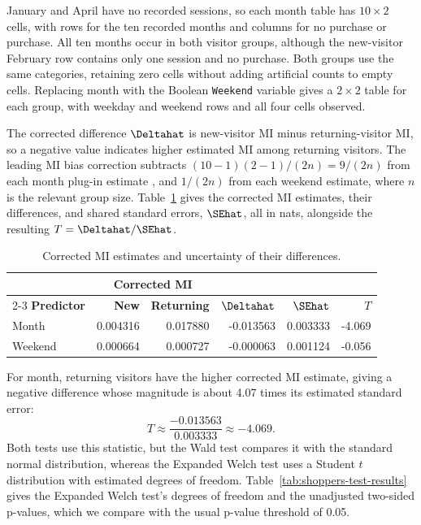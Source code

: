 \begingroup
\setlength{\intextsep}{4pt}
\setlength{\abovecaptionskip}{4pt}
January and April have no recorded sessions, so each month table has
\(10\times2\) cells, with rows for the ten recorded months and columns
for no purchase or purchase. All ten months occur in both visitor groups,
although the new-visitor February row contains only one session and no
purchase. Both groups use the same categories, retaining zero cells
without adding artificial counts to empty cells. Replacing month with the
Boolean \texttt{Weekend}
variable gives a \(2\times2\) table for each group, with weekday and
weekend rows and all four cells observed.

The corrected difference \(\Deltahat\) is new-visitor MI minus
returning-visitor MI, so a negative value indicates higher estimated MI
among returning visitors. The leading MI bias correction subtracts
\((10-1)(2-1)/(2n)=9/(2n)\) from each month plug-in estimate
\citep{miller1955,moddemeijer1989}, and \(1/(2n)\) from each weekend
estimate, where \(n\) is the relevant group size.
Table~\ref{tab:shoppers-application} gives the corrected MI estimates,
their differences, and shared standard errors, \(\SEhat\), all in nats,
alongside the resulting \(T=\Deltahat/\SEhat\).

\begin{table}[H]
\centering
\caption{Corrected MI estimates and uncertainty of their differences.}
\label{tab:shoppers-application}
\thesistableformat
\begin{tabular*}{\textwidth}{@{\extracolsep{\fill}}lrrrrr@{}}
\toprule
 & \multicolumn{2}{c}{\textbf{Corrected MI}} & & & \\
\cmidrule(lr){2-3}
\textbf{Predictor} & \textbf{New} & \textbf{Returning} & \(\Deltahat\) & \(\SEhat\) & \(T\)\\
\midrule
Month & 0.004316 & 0.017880 & -0.013563 & 0.003333 & -4.069\\
\addlinespace[0.35em]
Weekend & 0.000664 & 0.000727 & -0.000063 & 0.001124 & -0.056\\
\bottomrule
\end{tabular*}
\end{table}

For month, returning visitors have the higher corrected MI estimate,
giving a negative difference whose magnitude is about 4.07 times its
estimated standard error:
\begin{equation}
  T\approx\frac{-0.013563}{0.003333}\approx-4.069.
  \label{eq:shoppers-month-statistic}
\end{equation}
Both tests use this statistic, but the Wald test compares it with the
standard normal distribution, whereas the Expanded Welch test uses a Student
\(t\) distribution with estimated degrees of freedom.
Table~\ref{tab:shoppers-test-results} gives the Expanded Welch test's degrees of freedom and the unadjusted two-sided p-values, which we compare with
the usual p-value threshold of 0.05.

